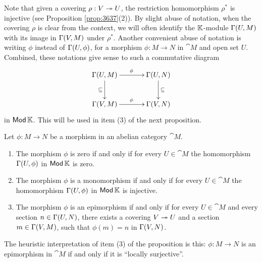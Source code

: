 Note that given a covering $\rho : V \twoheadrightarrow U$, the restriction 
homomorphism $\rho^*$ is injective (see Proposition \ref{prop:3637}(2)). By 
slight abuse of notation, when the covering $\rho$ is clear from the context, 
we will often identify the $\mathbb{K}$-module $\Gamma(U, M)$ with its image in 
$\Gamma(V, M)$ under $\rho^*$. 
Another convenient abuse of notation is writing
$\phi$ instead of $\Gamma(U, \phi)$, for a morphism $\phi : M \to N$ in $\cat{M}$ 
and open set $U$. Combined, these notations give sense to such 
a commutative diagram
\begin{equation} \label{eqn:4935}
\UseTips \xymatrix @C=8ex @R=6ex {
\Ga(U, M)
\ar[r]^{\phi}
\ar[d]_{\sub}
&
\Ga(U, N)
\ar[d]^{\sub}
\\
\Ga(V, M)
\ar[r]^{\phi}
&
\Ga(V, N)
} 
\end{equation}
in $\operatorname{\mathsf{Mod}} \mathbb{K}$. This will be used in item (3) of the next proposition. 

\begin{prop} \label{prop:3635}
Let $\phi : M \to N$ be a morphism in an abelian category $\cat{M}$.
\begin{enumerate}
\item The morphism $\phi$ is zero if and only if
for every $U \in \cat{M}$ the homomorphism $\Gamma(U, \phi)$ 
in $\operatorname{\mathsf{Mod}} \mathbb{K}$ is zero.

\item  The morphism $\phi$ is a monomorphism if and only if for every $U \in 
\cat{M}$ the homomorphism $\Gamma(U, \phi)$ 
in $\operatorname{\mathsf{Mod}} \mathbb{K}$ is injective. 

\item  The morphism  $\phi$ is an epimorphism if and only if for every $U \in 
\cat{M}$ and every section $n \in \Gamma(U, N)$, there exists a covering $V \twoheadrightarrow 
U$ and a section $m \in \Gamma(V, M)$, such that 
$\phi(m) = n$ in $\Gamma(V, N)$.
\end{enumerate}
\end{prop}

The heuristic interpretation of item (3) of the proposition is this: 
$\phi : M \to N$ is an epimorphism in $\cat{M}$ if and only if it is ``locally 
surjective''.

